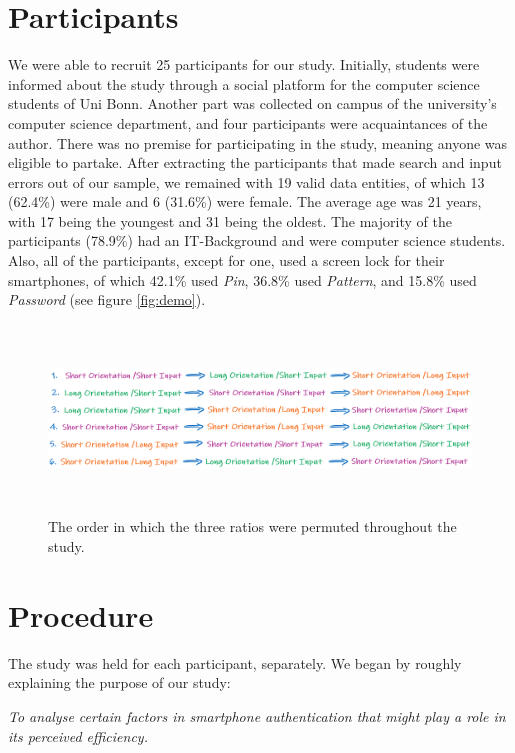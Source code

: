 \section{Participants}

We were able to recruit 25 participants for our study. Initially, students were informed about the study through a social platform for the computer science students of Uni Bonn. Another part was collected on campus of the university's computer science department, and four participants were acquaintances of the author. There was no premise for participating in the study, meaning anyone was eligible to partake. After extracting the participants that made search and input errors out of our sample, we remained with 19 valid data entities, of which 13 (62.4\%) were male and 6 (31.6\%) were female. The average age was 21 years, with 17 being the youngest and 31 being the oldest. The majority of the participants (78.9\%) had an IT-Background and were computer science students. Also, all of the participants, except for one, used a screen lock for their smartphones, of which 42.1\% used \textit{Pin}, 36.8\% used \textit{Pattern}, and 15.8\% used \textit{Password} (see figure \ref{fig:demo}).  

\begin{figure}[t!]
\centering
\includegraphics[width=15cm, height=5cm]{Chapters/graphics/permutation.PNG}
\caption{The order in which the three ratios were permuted throughout the study.}
\label{fig:permutation}
\end{figure}


\section{Procedure}
The study was held for each participant, separately. We began by roughly explaining the purpose of our study:

\begin{center}
\textit{To analyse certain factors in smartphone authentication that might play a role in its perceived efficiency.}    
\end{center}

